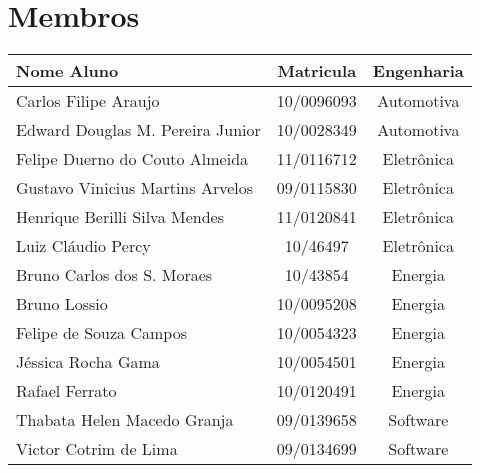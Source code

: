 \chapter*{Membros}
\begin{table}[ht!]
\centering
\label{tab:membros}
\begin{tabular}{|l|c|c|}
Nome Aluno                       & Matricula  & Engenharia \\
\hline
Carlos Filipe Araujo             & 10/0096093 & Automotiva \\
Edward Douglas M. Pereira Junior & 10/0028349 & Automotiva \\
\hline
Felipe Duerno do Couto Almeida   & 11/0116712 & Eletrônica \\
Gustavo Vinicius Martins Arvelos & 09/0115830 & Eletrônica \\
Henrique Berilli Silva Mendes    & 11/0120841 & Eletrônica \\
Luiz Cláudio Percy               & 10/46497   & Eletrônica \\
\hline
Bruno Carlos dos S. Moraes       & 10/43854        & Energia    \\
Bruno Lossio                     & 10/0095208 & Energia    \\
Felipe de Souza Campos           & 10/0054323 & Energia    \\
Jéssica Rocha Gama               & 10/0054501 & Energia    \\
Rafael Ferrato                   & 10/0120491 & Energia    \\
\hline
Thabata Helen Macedo Granja      & 09/0139658 & Software   \\
Victor Cotrim de Lima            & 09/0134699 & Software   \\ \hline
\end{tabular}
\end{table}
